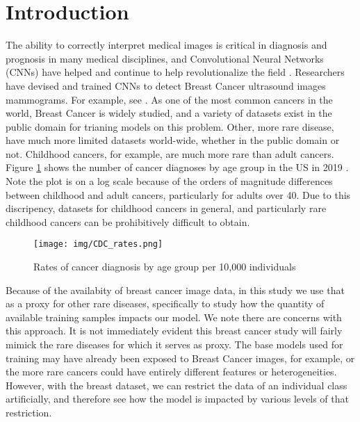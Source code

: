 \documentclass[sn-mathphys,Numbered]{sn-jnl}%
\theoremstyle{thmstyleone}%
\theoremstyle{thmstyletwo}%
\theoremstyle{thmstylethree}%
\begin{document}
\section{Introduction}\label{sec_intro}
The ability to correctly interpret medical images is critical in diagnosis and prognosis in many medical disciplines, and Convolutional Neural Networks (CNNs) have helped and continue to help revolutionalize the field \cite{2022_survey}.  Researchers have devised and trained CNNs to detect Breast Cancer ultrasound images mammograms.  For example, see \cite{AREVALO2016248}.  As one of the most common cancers in the world, Breast Cancer is widely studied, and a variety of datasets exist in the public domain for trianing models on this problem.  Other, more rare disease, have much more limited datasets world-wide, whether in the public domain or not.  Childhood cancers, for example, are much more rare than adult cancers.  Figure \ref{fig:CDC_Rates} shows the number of cancer diagnoses by age group in the US in 2019 \cite{cdc}.  Note the plot is on a log scale because of the orders of magnitude differences between childhood and adult cancers, particularly for adults over 40.  Due to this discripency, datasets for childhood cancers in general, and particularly rare childhood cancers can be prohibitively difficult to obtain.  


\begin{figure}[!htbp]
    \centering

    \texttt{[image: img/CDC\_rates.png]}

    \caption{Rates of cancer diagnosis by age group per 10,000 individuals \cite{cdc}}
    \label{fig:CDC_Rates}
\end{figure}


Because of the availabity of breast cancer image data, in this study we use that as a proxy for other rare diseases, specifically to study how the quantity of available training samples impacts our model.  We note there are concerns with this approach.  It is not immediately evident this breast cancer study will fairly mimick the rare diseases for which it serves as proxy.  The base models used for training may have already been exposed to Breast Cancer images, for example, or the more rare cancers could have entirely different features or heterogeneities.   However, with the breast dataset, we can restrict the data of an individual class artificially, and therefore see how the model is impacted by various levels of that restriction.
\end{document}
